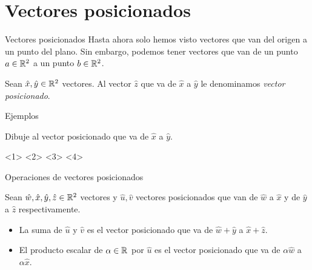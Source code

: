     \section{Vectores posicionados}
    \begin{frame}{Vectores posicionados}
        Hasta ahora solo hemos visto vectores que van del origen a un punto del plano. Sin embargo, podemos tener vectores que van de un punto $a\in\rmath[2]$ a un punto $b\in\rmath[2]$. 
        \begin{mdefinition}
            Sean $\hat{x},\hat{y}\in\rmath[2]$ vectores. Al vector $\hat{z}$ que va de $\hat{x}$ a $\hat{y}$ le denominamos \emph{vector posicionado}.
        \end{mdefinition}
    \end{frame}
    \begin{frame}{}
        \begin{figure}
            \centering
        \end{figure}
    \end{frame}
    \begin{frame}{Ejemplos}
        \begin{example}
            Dibuje al vector posicionado que va de $\hat{x}$ a $\hat{y}$.
            \begin{itemize}
                <1>
                <2>
                <3>
                <4>
            \end{itemize}
        \end{example}
    \end{frame}
    \begin{frame}{Operaciones de vectores posicionados}
        \begin{mdefinition}
            Sean $\hat{w},\hat{x},\hat{y},\hat{z}\in\rmath[2]$ vectores y $\hat{u}, \hat{v}$ vectores posicionados que van de $\hat{w}$ a $\hat{x}$ y de $\hat{y}$ a $\hat{z}$ respectivamente.
            \begin{itemize}
                \item La suma de $\hat{u}$ y $\hat{v}$ es el vector posicionado que va de $\hat{w}+\hat{y}$ a $\hat{x}+\hat{z}$.
                \item El producto escalar de $\alpha\in\rmath$ por $\hat{u}$ es el vector posicionado que va de $\alpha\hat{w}$ a $\alpha\hat{x}$.
            \end{itemize}
        \end{mdefinition}
    \end{frame}
